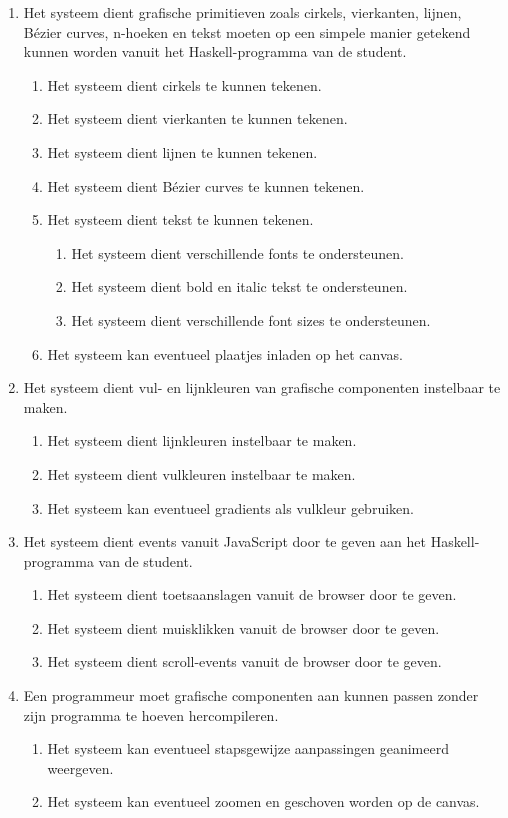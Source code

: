 \begin{enumerate}[{R}1]
	\item Het systeem dient grafische primitieven zoals cirkels, vierkanten, lijnen, Bézier curves, n-hoeken en tekst moeten op een simpele manier getekend kunnen worden vanuit het Haskell-programma van de student.
	\begin{enumerate}
		\item Het systeem dient cirkels te kunnen tekenen.
		\item Het systeem dient vierkanten te kunnen tekenen.
		\item Het systeem dient lijnen te kunnen tekenen.
		\item Het systeem dient Bézier curves te kunnen tekenen.
		\item Het systeem dient tekst te kunnen tekenen.
		\begin{enumerate}
			\item Het systeem dient verschillende fonts te ondersteunen.
			\item Het systeem dient bold en italic tekst te ondersteunen.
			\item Het systeem dient verschillende font sizes te ondersteunen.
		\end{enumerate}
		\item Het systeem kan eventueel plaatjes inladen op het canvas.
	\end{enumerate}
	\item Het systeem dient vul- en lijnkleuren van grafische componenten instelbaar te maken.
	\begin{enumerate}
		\item Het systeem dient lijnkleuren instelbaar te maken.
		\item Het systeem dient vulkleuren instelbaar te maken.
		\item Het systeem kan eventueel gradients als vulkleur gebruiken.
	\end{enumerate}
	\item Het systeem dient events vanuit JavaScript door te geven aan het Haskell-programma van de student.
	\begin{enumerate}
		\item Het systeem dient toetsaanslagen vanuit de browser door te geven.
		\item Het systeem dient muisklikken vanuit de browser door te geven.
		\item Het systeem dient scroll-events vanuit de browser door te geven.
	\end{enumerate}
	\item Een programmeur moet grafische componenten aan kunnen passen zonder zijn programma te hoeven hercompileren.
	\begin{enumerate}
		\item Het systeem kan eventueel stapsgewijze aanpassingen geanimeerd weergeven.
		\item Het systeem kan eventueel zoomen en geschoven worden op de canvas.
	\end{enumerate}
	\setcounter{startvalue}{\value{enumi}}
\end{enumerate}
